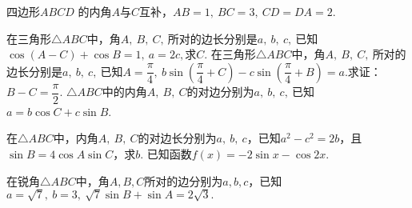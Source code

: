 \begin{questions}
\kongbai
\qs 四边形$ ABCD $ 的内角$ A $与$ C $互补，$ AB=1,\ BC=3,\ CD=DA=2. $
\kongbai
\qs 在三角形$\triangle ABC$中，角$A,\ B,\ C,\ $所对的边长分别是$a,\ b,\ c,\ $已知$ \cos (A-C)+\cos B=1,\ a=2c, $求$ C $.
\kongbai
\qs 在三角形$\triangle ABC$中，角$A,\ B,\ C,\ $所对的边长分别是$a,\ b,\ c,\ $已知$ A=\dfrac{\pi}{4},\ b\sin \left(\dfrac{\pi}{4}+C\right)-c\sin \left(\dfrac{\pi}{4}+B\right)=a. $求证：$ B-C=\dfrac{\pi}{2}. $
\kongbai
\qs $\triangle ABC$中的内角$ A,\ B,\ C $的对边分别为$ a,\ b,\ c,\  $已知$ a=b\cos C+c\sin B $.
\kongbai
\qs 在$\triangle ABC$中，内角$ A,\ B,\ C $的对边长分别为$ a,\ b,\ c $，已知$ a^2-c^2=2b $，且$ \sin B=4\cos A\sin C $，求$ b $.
\kongbai
\qs 已知函数$f(x)=-2\sin x-\cos 2x$.
\kongbai
\qs 在锐角$\triangle ABC$中，角$ A,B,C $所对的边分别为$ a,b,c $，已知$ a=\sqrt{7},\ b=3,\ \sqrt{7}\sin B+\sin A=2\sqrt{3}.$
\begin{parts}

\end{parts}
\end{questions}
